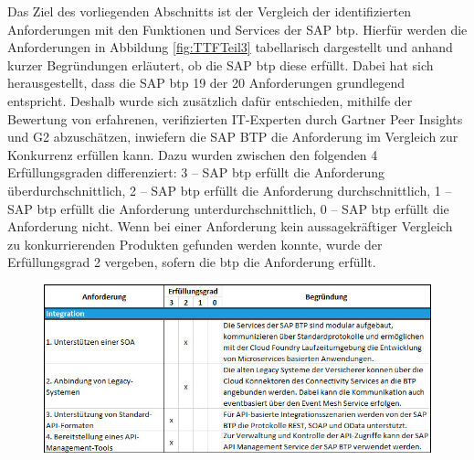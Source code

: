 Das Ziel des vorliegenden Abschnitts ist der Vergleich der identifizierten Anforderungen mit den Funktionen und Services der SAP \ac{btp}. Hierfür werden die Anforderungen in Abbildung \ref{fig:TTFTeil3} tabellarisch dargestellt und anhand kurzer Begründungen erläutert, ob die SAP \ac{btp} diese erfüllt. Dabei hat sich herausgestellt, dass die SAP \ac{btp} 19 der 20 Anforderungen grundlegend entspricht. Deshalb wurde sich zusätzlich dafür entschieden, mithilfe der Bewertung von erfahrenen, verifizierten IT-Experten durch Gartner Peer Insights und G2 abzuschätzen, inwiefern die SAP BTP die Anforderung im Vergleich zur Konkurrenz erfüllen kann. Dazu wurden zwischen den folgenden 4 Erfüllungsgraden differenziert: 3 – SAP \ac{btp} erfüllt die Anforderung überdurchschnittlich, 2 – SAP \ac{btp} erfüllt die Anforderung durchschnittlich, 1 – SAP \ac{btp} erfüllt die Anforderung unterdurchschnittlich, 0 – SAP \ac{btp} erfüllt die Anforderung nicht. Wenn bei einer Anforderung kein aussagekräftiger Vergleich zu konkurrierenden Produkten gefunden werden konnte, wurde der Erfüllungsgrad 2 vergeben, sofern die \ac{btp} die Anforderung erfüllt. 

\begin{figure}[ht]
    \centering
    \includegraphics[width=1\textwidth]{img/TTFTeil1_1_4.jpg}
    \label{fig:TTFTeil1}
\end{figure}

\FloatBarrier


